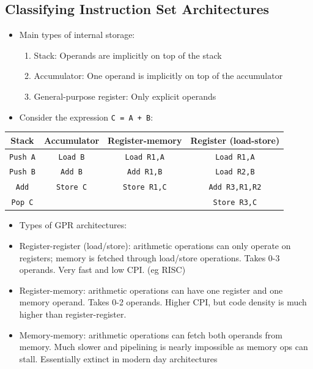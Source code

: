 \documentclass[11pt, a4paper]{article}
\theoremstyle{definition}
\theoremstyle{remark}
\begin{document}
\subsection{Classifying Instruction Set Architectures}
\begin{itemize}
    \item Main types of internal storage:
    \begin{enumerate}
        \item Stack: Operands are implicitly on top of the stack
        \item Accumulator: One operand is implicitly on top of the accumulator
        \item General-purpose register: Only explicit operands
    \end{enumerate}
    \item Consider the expression \texttt{C = A + B}:
\end{itemize}
\begin{center}
\begin{tabular}{c c c c}
\hline
Stack & Accumulator & Register-memory & Register (load-store) \\
\hline 
\hline 
\texttt{Push A}&\texttt{Load B}&\texttt{Load R1,A}&\texttt{Load R1,A}\\
\hline
\texttt{Push B}&\texttt{Add B}&\texttt{Add R1,B}&\texttt{Load R2,B}\\
\hline 
\texttt{Add}&\texttt{Store C}&\texttt{Store R1,C}&\texttt{Add R3,R1,R2}\\
\hline
\texttt{Pop C}&&&\texttt{Store R3,C}\\
\hline
\end{tabular}
\end{center}
\begin{itemize}
  \item Types of GPR architectures:
  \item Register-register (load/store): arithmetic operations can only operate on registers; memory is fetched through load/store operations. Takes 0-3 operands. Very fast and low CPI. (eg RISC)
  \item Register-memory: arithmetic operations can have one register and one memory operand. Takes 0-2 operands. Higher CPI, but code density is much higher than register-register.
  \item Memory-memory: arithmetic operations can fetch both operands from memory. Much slower and pipelining is nearly impossible as memory ops can stall. Essentially extinct in modern day architectures
\end{itemize}
\end{document}
